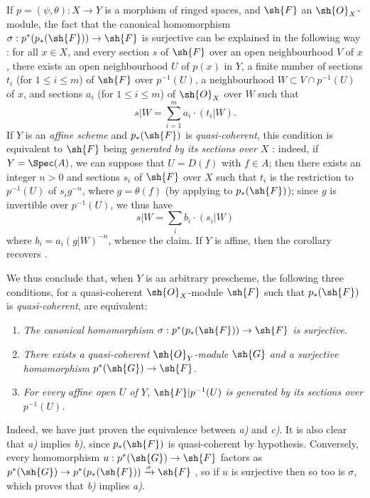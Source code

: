 \begin{remarks}[3.4.7]
\label{II.3.4.7}
If $p=(\psi,\theta):X\to Y$ is a morphism of ringed spaces, and $\sh{F}$ an $\sh{O}_X$-module, the fact that the canonical homomorphism $\sigma:p^*(p_*(\sh{F}))\to\sh{F}$ is surjective can be explained in the following way : for all $x\in X$, and every section $s$ of $\sh{F}$ over an open neighbourhood $V$ of $x$, there exists an open neighbourhood $U$ of $p(x)$ in $Y$, a finite number of sections $t_i$ (for $1\leq i\leq m$) of $\sh{F}$ over $p^{-1}(U)$, a neighbourhood $W\subset V\cap p^{-1}(U)$ of $x$, and sections $a_i$ (for $1\leq i\leq m$) of $\sh{O}_X$ over $W$ such that
\[
  s|W = \sum_{i=1}^m a_i\cdot(t_i|W).
\]
If $Y$ is an \emph{affine scheme} and $p_*(\sh{F})$ is \emph{quasi-coherent}, this condition is equivalent to $\sh{F}$ being \emph{generated by its sections over $X$} : indeed, if $Y=\Spec(A)$, we can suppose that $U=D(f)$ with $f\in A$;
then there exists an integer $n>0$ and sections $s_i$ of $\sh{F}$ over $X$ such that $t_i$ is the restriction to $p^{-1}(U)$ of $s_ig^{-n}$, where $g=\theta(f)$ (by applying  to $p_*(\sh{F})$);
since $g$ is invertible over $p^{-1}(U)$, we thus have
\[
  s|W = \sum_i b_i\cdot(s_i|W)
\]
where $b_i=a_i(g|W)^{-n}$, whence the claim.
If $Y$ is affine, then the corollary  recovers .

We thus conclude that, when $Y$ is an arbitrary prescheme, the following three conditions, for a quasi-coherent $\sh{O}_X$-module $\sh{F}$ such that $p_*(\sh{F})$ is \emph{quasi-coherent}, are equivalent:
\begin{enumerate}
  \item[a)] \emph{The canonical homomorphism $\sigma:p^*(p_*(\sh{F}))\to\sh{F}$ is surjective.}
  \item[b)] \emph{There exists a quasi-coherent $\sh{O}_Y$-module $\sh{G}$ and a surjective homomorphism $p^*(\sh{G})\to\sh{F}$.}
  \item[c)] \emph{For every affine open $U$ of $Y$, $\sh{F}|p^{-1}(U)$ is generated by its sections over $p^{-1}(U)$.}
\end{enumerate}

Indeed, we have just proven the equivalence between \emph{a)} and \emph{c)}.
It is also clear that \emph{a)} implies \emph{b)}, since $p_*(\sh{F})$ is quasi-coherent by hypothesis.
Conversely, every homomorphism $u:p^*(\sh{G})\to\sh{F}$ factors as $p^*(\sh{G})\to p^*(p_*(\sh{F}))\xrightarrow{\sigma}\sh{F}$ , so if $u$ is surjective then so too is $\sigma$, which proves that \emph{b)} implies \emph{a)}.
\end{remarks}

